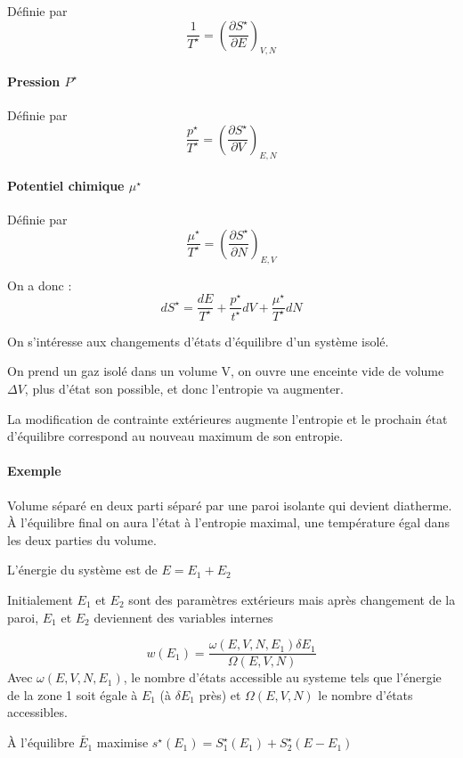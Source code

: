 \documentclass[12pt,a4paper]{report}
\begin{document}
Définie par 
\[
	\dfrac{1}{T^\star} = \left( \dfrac{\partial S^\star}{\partial E}\right)_{V,N}
\]

\paragraph{Pression \(P^\star\)}

Définie par
\[
	\dfrac{p^\star}{T^\star} = \left( \dfrac{\partial S^\star}{\partial V}\right)_{E,N}
\]

\paragraph{Potentiel chimique \(\mu^\star\)}

Définie par
\[
	\dfrac{\mu^\star}{T^\star} = \left( \dfrac{\partial S^\star}{\partial N}\right)_{E,V}
\]

On a donc :
\[
	dS^\star = \dfrac{dE}{T^\star} + \dfrac{p^\star}{t^\star}dV + \dfrac{\mu^\star}{T^\star}dN
\]

On s'intéresse aux changements d'états d'équilibre d'un système isolé.

On prend un gaz isolé dans un volume V, on ouvre une enceinte vide de volume \(\Delta V\), plus d'état son possible, et donc l'entropie va augmenter.

La modification de contrainte extérieures augmente l'entropie et le prochain état d'équilibre correspond au nouveau maximum de son entropie.

\paragraph{Exemple}

Volume séparé en deux parti séparé par une paroi isolante qui devient diatherme. À l'équilibre final on aura l'état à l'entropie maximal, une température égal dans les deux parties du volume.

L'énergie du système est de \(E = E_1 + E_2\)

Initialement \(E_1\) et \(E_2\) sont des paramètres extérieurs mais après changement de la paroi, \(E_1\) et \(E_2\) deviennent des variables internes

\[
	w(E_1) = \dfrac{\omega(E,V,N,E_1)\delta E_1}{\Omega(E,V,N)}
\]
Avec \(\omega(E,V,N,E_1)\), le nombre d'états accessible au systeme tels que l'énergie de la zone 1 soit égale à \(E_1\) (à \(\delta E_1\) près) et \(\Omega(E,V,N)\) le nombre d'états accessibles.

À l'équilibre \(\tilde{E_1}\) maximise \(s^\star(E_1) = S_1^\star(E_1) + S_2^\star(E-E_1)\)
\end{document}
